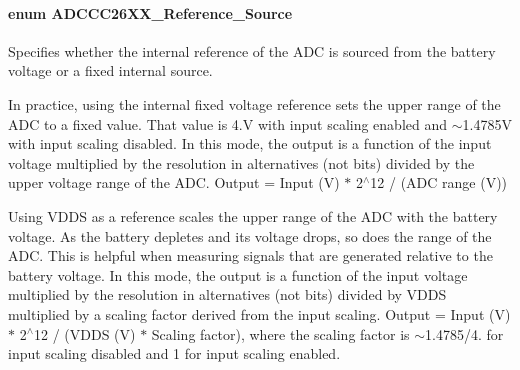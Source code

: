 \paragraph[{A\+D\+C\+C\+C26\+X\+X\+\_\+\+Reference\+\_\+\+Source}]{\setlength{\rightskip}{0pt plus 5cm}enum {\bf A\+D\+C\+C\+C26\+X\+X\+\_\+\+Reference\+\_\+\+Source}}\label{_a_d_c_c_c26_x_x_8h_a5ed293d16be70036c4008865dbe33b98}


Specifies whether the internal reference of the A\+D\+C is sourced from the battery voltage or a fixed internal source. 


\begin{DoxyItemize}
\item In practice, using the internal fixed voltage reference sets the upper range of the A\+D\+C to a fixed value. That value is 4.\+V with input scaling enabled and $\sim$1.4785\+V with input scaling disabled. In this mode, the output is a function of the input voltage multiplied by the resolution in alternatives (not bits) divided by the upper voltage range of the A\+D\+C. Output = Input (V) $\ast$ 2$^\wedge$12 / (A\+D\+C range (V))
\item Using V\+D\+D\+S as a reference scales the upper range of the A\+D\+C with the battery voltage. As the battery depletes and its voltage drops, so does the range of the A\+D\+C. This is helpful when measuring signals that are generated relative to the battery voltage. In this mode, the output is a function of the input voltage multiplied by the resolution in alternatives (not bits) divided by V\+D\+D\+S multiplied by a scaling factor derived from the input scaling. Output = Input (V) $\ast$ 2$^\wedge$12 / (V\+D\+D\+S (V) $\ast$ Scaling factor), where the scaling factor is $\sim$1.4785/4. for input scaling disabled and 1 for input scaling enabled.
\end{DoxyItemize}

